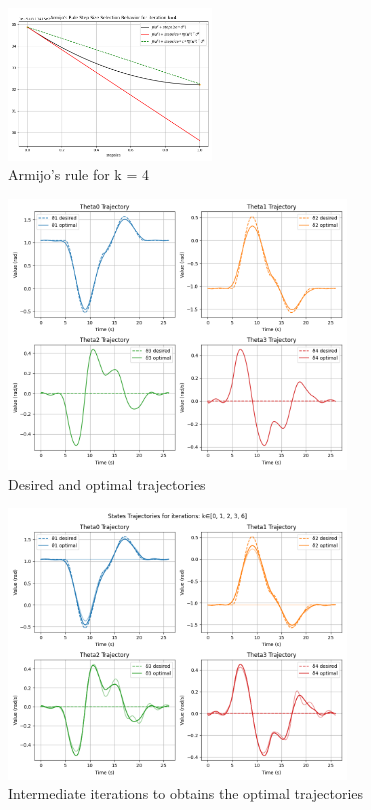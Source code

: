 \documentclass[a4paper,11pt,oneside]{book}
\begin{document}
\begin{figure}[H]
    \centering
    \includegraphics[width=0.48\textwidth]{Armijo's_Rule_T2_k=4.png}
    \caption{Armijo's rule for k = 4}
    \label{fig:enter-label}
\end{figure}
\begin{figure}[H]
    \centering
    \includegraphics[width=0.8\textwidth]{States_Trajectories_T2.png}
    \caption{Desired and optimal trajectories}
    \label{fig:enter-label}
\end{figure}
\begin{figure}[H]
    \centering
    \includegraphics[width=0.8\textwidth]{States_Trajectories_for_iterations_T2.png}
    \caption{Intermediate iterations to obtains the optimal trajectories}
    \label{fig:enter-label}
\end{figure}
\end{document}
